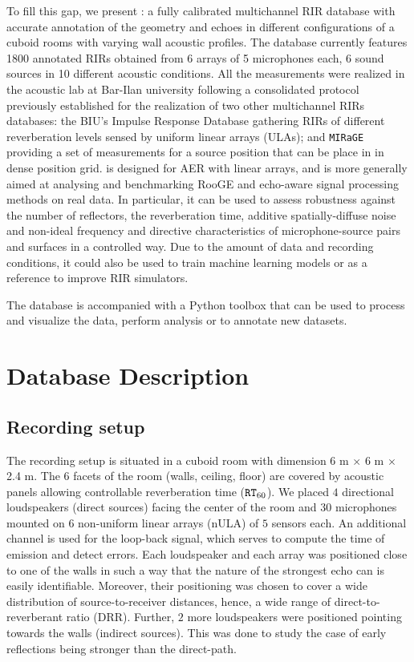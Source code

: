 To fill this gap, we present \dEchorate{}: a fully calibrated multichannel RIR database with accurate annotation of the geometry and echoes in different configurations of a cuboid rooms with varying wall acoustic profiles.
The database currently features 1800 annotated RIRs obtained from 6 arrays of 5 microphones each, 6 sound sources in 10 different acoustic conditions. All the measurements were realized in the acoustic lab at Bar-Ilan university following a consolidated protocol previously established for the realization of two other multichannel RIRs databases: the BIU's Impulse Response Database \cite{Hadad2014multichannel} gathering RIRs of different reverberation levels sensed by uniform linear arrays (ULAs); and \texttt{MIRaGE} \cite{Cmejla2019mirage} providing a set of measurements for a source position that can be place in in dense position grid. \dEchorate{} is designed for AER with linear arrays, and is more generally aimed at analysing and benchmarking RooGE and echo-aware signal processing methods on real data. In particular, it can be used to assess robustness against the number of reflectors, the reverberation time, additive spatially-diffuse noise and non-ideal frequency and directive characteristics of microphone-source pairs and surfaces in a controlled way. Due to the amount of data and recording conditions, it could also be used to train machine learning models or as a reference to improve RIR simulators.

The database is accompanied with a Python toolbox that can be used to process and visualize the data,  perform analysis or to annotate new datasets.

\section{Database Description}



\subsection{Recording setup}
The recording setup is situated in a cuboid room with dimension 6 m $\times$ 6 m $\times$ 2.4 m. The 6 facets of the room (walls, ceiling, floor) are covered by acoustic panels allowing controllable reverberation time ($\mathtt{RT}_{60}$). We placed $4$ directional loudspeakers (direct sources) facing the center of the room and $30$ microphones mounted on $6$ non-uniform linear arrays (nULA) of $5$ sensors each. An additional channel is used for the loop-back signal, which serves to compute the time of emission and detect errors. Each loudspeaker and each array was positioned close to one of the walls in such a way that the nature of the strongest echo can is easily identifiable. Moreover, their positioning was chosen to cover a wide distribution of source-to-receiver distances, hence, a wide range of direct-to-reverberant ratio (DRR). Further, $2$ more loudspeakers were positioned pointing towards the walls (indirect sources). This was done to study the case of early reflections being stronger than the direct-path.

